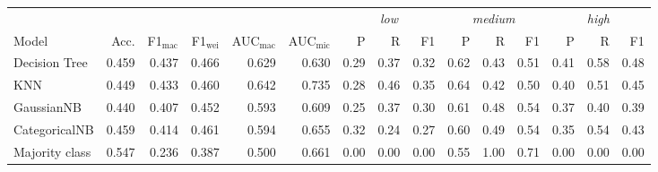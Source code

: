 \begin{tabular}{@{}lrrrrr|rrr|rrr|rrr@{}}
\toprule
 & & & & & & \multicolumn{3}{c|}{\textit{low}} & \multicolumn{3}{c|}{\textit{medium}} & \multicolumn{3}{c}{\textit{high}} \\ Model & Acc. & F1$_\mathrm{mac}$ & F1$_\mathrm{wei}$ & AUC$_\mathrm{mac}$ & AUC$_\mathrm{mic}$ & P & R & F1 & P & R & F1 & P & R & F1 \\
\midrule
Decision Tree & 0.459 & 0.437 & 0.466 & 0.629 & 0.630 & 0.29 & 0.37 & 0.32 & 0.62 & 0.43 & 0.51 & 0.41 & 0.58 & 0.48 \\
KNN & 0.449 & 0.433 & 0.460 & 0.642 & 0.735 & 0.28 & 0.46 & 0.35 & 0.64 & 0.42 & 0.50 & 0.40 & 0.51 & 0.45 \\
GaussianNB & 0.440 & 0.407 & 0.452 & 0.593 & 0.609 & 0.25 & 0.37 & 0.30 & 0.61 & 0.48 & 0.54 & 0.37 & 0.40 & 0.39 \\
CategoricalNB & 0.459 & 0.414 & 0.461 & 0.594 & 0.655 & 0.32 & 0.24 & 0.27 & 0.60 & 0.49 & 0.54 & 0.35 & 0.54 & 0.43 \\
\midrule
Majority class & 0.547 & 0.236 & 0.387 & 0.500 & 0.661 & 0.00 & 0.00 & 0.00 & 0.55 & 1.00 & 0.71 & 0.00 & 0.00 & 0.00 \\
\bottomrule
\end{tabular}

